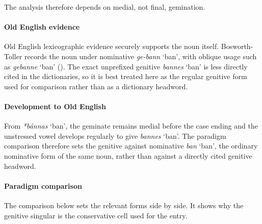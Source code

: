 \documentclass[
  british,
  a4paper,
]{article}
\providecommand{\Recon}[1]{\emph{*#1}}
\begin{document}
The analysis therefore depends on medial, not final, gemination.

\paragraph{Old English evidence}\label{old-english-evidence-117}

Old English lexicographic evidence securely supports the noun itself.
Bosworth-Toller records the noun under nominative {\emph{ge-bann}}
`ban', with oblique usage such as {\emph{gebanne}} `ban'
(). The
exact unprefixed genitive {\emph{bannes}} `ban' is less directly cited
in the dictionaries, so it is best treated here as the regular genitive
form used for comparison rather than as a dictionary headword.

\paragraph{Development to Old
English}\label{development-to-old-english-117}

From \Recon{bánnas} `ban', the geminate remains medial before the case
ending and the unstressed vowel develops regularly to give
{\emph{bannes}} `ban'. The paradigm comparison therefore sets the
genitive against nominative {\emph{ban}} `ban', the ordinary nominative
form of the same noun, rather than against a directly cited genitive
headword.

\paragraph{Paradigm comparison}\label{paradigm-comparison}

The comparison below sets the relevant forms side by side. It shows why
the genitive singular is the conservative cell used for the entry.
\end{document}
